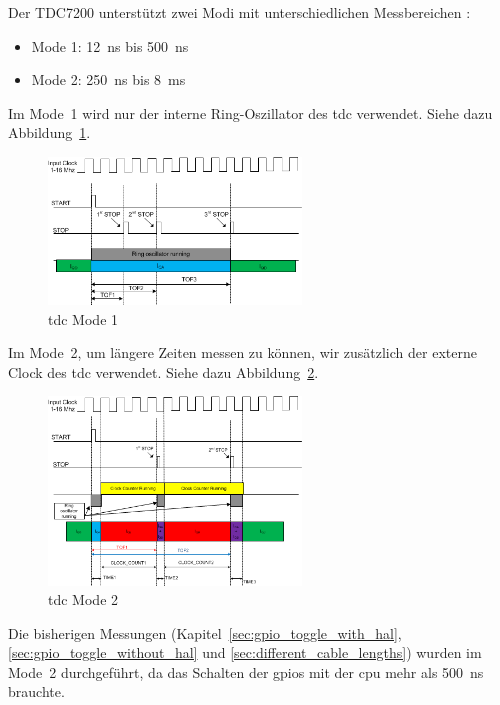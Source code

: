 Der TDC7200 unterstützt zwei Modi mit unterschiedlichen Messbereichen \cite{ti2016tdc7200_datasheet}:

\begin{itemize}
    \item Mode 1: 12~ns bis 500~ns
    \item Mode 2: 250~ns bis 8~ms
\end{itemize}

Im Mode~1 wird nur der interne Ring-Oszillator des \acrshort{tdc} verwendet. Siehe dazu Abbildung~\ref{fig:tdc_mode1}.

\begin{figure}[H]
    \centering
    \includegraphics[width=0.6\textwidth]{graphics/tdc_mode1.png}
    \caption[\acrshort{tdc} Mode 1]{\acrshort{tdc} Mode 1 \cite{ti2016tdc7200_datasheet}}\label{fig:tdc_mode1}
\end{figure}

Im Mode~2, um längere Zeiten messen zu können, wir zusätzlich der externe Clock des \acrshort{tdc} verwendet. Siehe dazu
Abbildung~\ref{fig:tdc_mode2}.

\begin{figure}[H]
    \centering
    \includegraphics[width=0.6\textwidth]{graphics/tdc_mode2.png}
    \caption[\acrshort{tdc} Mode 2]{\acrshort{tdc} Mode 2 \cite{ti2016tdc7200_datasheet}}\label{fig:tdc_mode2}
\end{figure}

Die bisherigen Messungen (Kapitel~\ref{sec:gpio_toggle_with_hal}, \ref{sec:gpio_toggle_without_hal} und
\ref{sec:different_cable_lengths}) wurden im Mode~2 durchgeführt, da das Schalten der \acrshort{gpio}s mit der
\acrshort{cpu} mehr als 500~ns brauchte.

